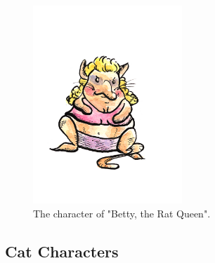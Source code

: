 \documentclass[12pt]{IEEEtran}
\begin{document}
	\begin{figure}[h]
		\centering
		\includegraphics[width=0.5\textwidth]{Rat_Betty.jpg}
		\caption{The character of "Betty, the Rat Queen".}
		\label{fig:betty}
	\end{figure}
	
\subsection{Cat Characters}
\label{subsec:catcharacters}
\end{document}
